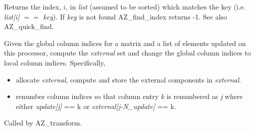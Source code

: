 
\vspace{2em}
{ \hrulefill}
\vspace{1em}

Returns the index, $i$, in {\it list\/} (assumed to be sorted) which matches
the key (i.e. {\it list[i] $==$ key\/}). If {\it key\/} is not found {\sf
  AZ\_find\_index} returns -1. See also {\sf AZ\_quick\_find}.

\vspace{2em}
{ \hrulefill}
\vspace{1em}






\vspace{2em}
{ \hrulefill}
\vspace{1em}

Given the global column indices for a matrix and a list of elements updated on
this processor, compute the {\it external} set and change the global column
indices to local column indices. Specifically,
\begin{itemize}
\item allocate {\it external\/}, compute and store the external components in
  {\it external\/}.
\item renumber column indices so that column entry {\it k\/} is renumbered as
  {\it j\/} where either {\it update[j]} == k or {\it external[j-N\_update]} ==
  k.
\end{itemize}
Called by {\sf AZ\_transform}.

\vspace{2em}
{ \hrulefill}
\vspace{1em}


